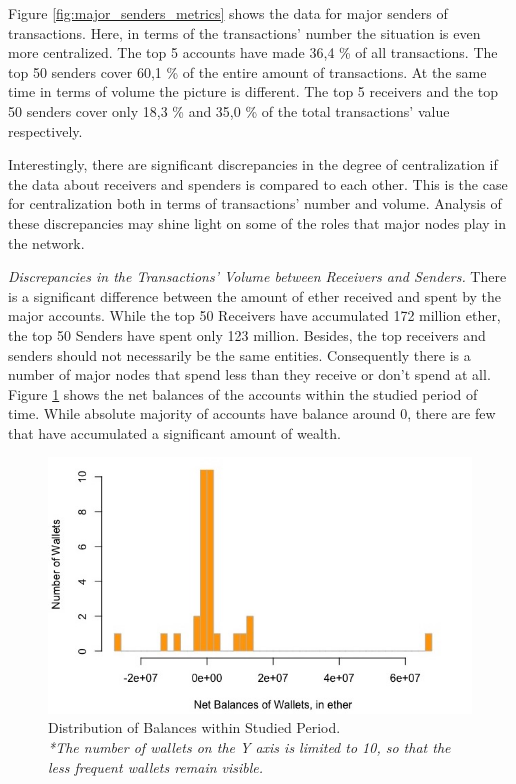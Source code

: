 Figure \ref{fig:major_senders_metrics} shows the data for major senders of transactions.
Here, in terms of the transactions' number the situation is even more centralized.
The top 5 accounts have made 36,4 \% of all transactions.
The top 50 senders cover 60,1 \% of the entire amount of transactions.
At the same time in terms of volume the picture is different.
The top 5 receivers and the top 50 senders cover only 18,3 \% and 35,0 \% of the total transactions' value respectively.

Interestingly, there are significant discrepancies in the degree of centralization if the data about receivers and spenders is compared to each other.
This is the case for centralization both in terms of transactions' number and volume.
Analysis of these discrepancies may shine light on some of the roles that major nodes play in the network.

\textit{Discrepancies in the Transactions' Volume between Receivers and Senders.} 
There is a significant difference between the amount of ether received and spent by the major accounts.
While the top 50 Receivers have accumulated 172 million ether, the top 50 Senders have spent only 123 million.
Besides, the top receivers and senders should not necessarily be the same entities. 
Consequently there is a number of major nodes that spend less than they receive or don't spend at all.
Figure \ref{fig:balances} shows the net balances of the accounts within the studied period of time. 
While absolute majority of accounts have balance around 0, there are few that have accumulated a significant amount of wealth.

\begin{figure}[!ht]
  \centering
  \includegraphics[width=1\linewidth]{figures/balances.jpeg}
  \caption{Distribution of Balances within Studied Period. \\ 
  \textit{*The number of wallets on the Y axis is limited to 10, so that the less frequent wallets remain visible.}}
  \label{fig:balances}
\end{figure}

